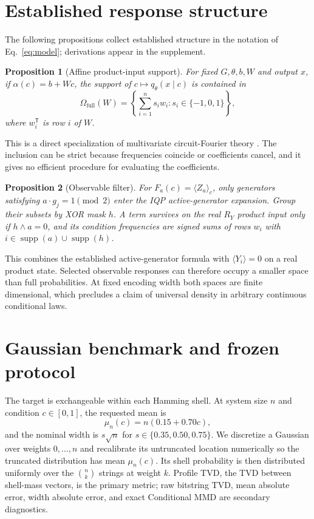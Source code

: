 \documentclass[a4paper,twocolumn,11pt,unpublished]{quantumarticle}
\newtheorem{proposition}{Proposition}
\newcommand{\supp}{\operatorname{supp}}
\begin{document}
\section{Established response structure}
\label{sec:response}

The following propositions collect established structure in the notation of
Eq.~\eqref{eq:model}; derivations appear in the supplement.

\begin{proposition}[Affine product-input support]
For fixed $G,\theta,b,W$ and output $x$, if
$\alpha(c)=b+Wc$, the support of $c\mapsto q_\theta(x\mid c)$ is contained in
\begin{equation}
 \Omega_{\mathrm{full}}(W)=
 \left\{\sum_{i=1}^{n}s_iw_i:s_i\in\{-1,0,1\}\right\},
 \label{eq:full-support}
\end{equation}
where $w_i^\mathsf{T}$ is row $i$ of $W$.
\end{proposition}

This is a direct specialization of multivariate circuit-Fourier theory
\cite{gilVidalInputRedundancy2020,schuldEffectDataEncoding2021,
casasMultidimensionalFourier2023}.  The inclusion can be strict because
frequencies coincide or coefficients cancel, and it gives no efficient
procedure for evaluating the coefficients.

\begin{proposition}[Observable filter]
For $F_a(c)=\langle Z_a\rangle_c$, only generators satisfying
$a\cdot g_j=1\pmod2$ enter the IQP active-generator expansion.  Group their
subsets by XOR mask $h$.  A term survives on the real $R_Y$ product input only
if $h\wedge a=0$, and its condition frequencies are signed sums of rows
$w_i$ with $i\in\supp(a)\cup\supp(h)$.
\end{proposition}

This combines the established active-generator formula
\cite{recio-armengolTrainClassicalDeploy2026} with
$\langle Y_i\rangle=0$ on a real product state.  Selected observable responses
can therefore occupy a smaller space than full probabilities.  At fixed
encoding width both spaces are finite dimensional, which precludes a claim of
universal density in arbitrary continuous conditional laws.

\section{Gaussian benchmark and frozen protocol}
\label{sec:protocol}

The target is exchangeable within each Hamming shell.  At system size $n$ and
condition $c\in[0,1]$, the requested mean is
\begin{equation}
 \mu_n(c)=n(0.15+0.70c),
\end{equation}
and the nominal width is $s\sqrt n$ for
$s\in\{0.35,0.50,0.75\}$.  We discretize a Gaussian over weights
$0,\ldots,n$ and recalibrate its untruncated location numerically so the
truncated distribution has mean $\mu_n(c)$.  Its shell probability is then
distributed uniformly over the $\binom nk$ strings at weight $k$.  Profile TVD,
the TVD between shell-mass vectors, is the primary metric; raw bitstring TVD,
mean absolute error, width absolute error, and exact Conditional MMD are
secondary diagnostics.
\end{document}
